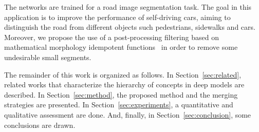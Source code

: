 The networks are trained for a road image segmentation task. The goal in this application is to improve the performance of self-driving cars, aiming to distinguish the road from different objects such pedestrians, sidewalks and cars. Moreover, we propose the use of a post-processing filtering based on mathematical morphology idempotent functions~\cite{najman13} in order to remove some undesirable small segments.

The remainder of this work is organized as follows. In Section~\ref{sec:related}, related works that characterize the hierarchy of concepts in deep models are described. In Section~\ref{sec:method}, the proposed method and the merging strategies are presented. In Section~\ref{sec:experiments}, a quantitative and qualitative assessment are done. And, finally, in Section~\ref{sec:conclusion}, some conclusions are drawn.

